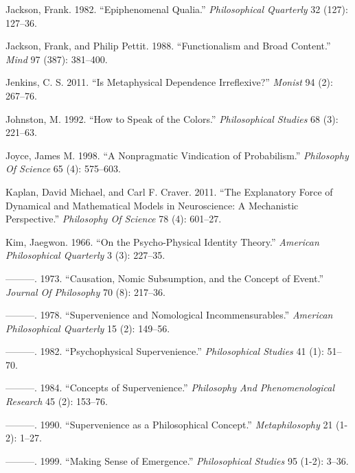 \documentclass[
  10pt,
  letterpaper,
  DIV=11,
  numbers=noendperiod,
  twoside]{scrartcl}
\newlength{\cslhangindent}
\newenvironment{CSLReferences}[2] %
 {\begin{list}{}{%
  \setlength{\itemindent}{0pt}
  \setlength{\leftmargin}{0pt}
  \setlength{\parsep}{0pt}
  \ifodd #1
   \setlength{\leftmargin}{\cslhangindent}
   \setlength{\itemindent}{-1\cslhangindent}
  \fi
  \setlength{\itemsep}{#2\baselineskip}}}
 {\end{list}}
\begin{document}
\begin{CSLReferences}{1}{0}
Jackson, Frank. 1982. {``Epiphenomenal Qualia.''} \emph{Philosophical
Quarterly} 32 (127): 127--36.

Jackson, Frank, and Philip Pettit. 1988. {``Functionalism and Broad
Content.''} \emph{Mind} 97 (387): 381--400.

Jenkins, C. S. 2011. {``Is Metaphysical Dependence Irreflexive?''}
\emph{Monist} 94 (2): 267--76.

Johnston, M. 1992. {``How to Speak of the Colors.''} \emph{Philosophical
Studies} 68 (3): 221--63.

Joyce, James M. 1998. {``A Nonpragmatic Vindication of Probabilism.''}
\emph{Philosophy Of Science} 65 (4): 575--603.

Kaplan, David Michael, and Carl F. Craver. 2011. {``The Explanatory
Force of Dynamical and Mathematical Models in Neuroscience: A
Mechanistic Perspective.''} \emph{Philosophy Of Science} 78 (4):
601--27.

Kim, Jaegwon. 1966. {``On the Psycho-Physical Identity Theory.''}
\emph{American Philosophical Quarterly} 3 (3): 227--35.

---------. 1973. {``Causation, Nomic Subsumption, and the Concept of
Event.''} \emph{Journal Of Philosophy} 70 (8): 217--36.

---------. 1978. {``Supervenience and Nomological Incommensurables.''}
\emph{American Philosophical Quarterly} 15 (2): 149--56.

---------. 1982. {``Psychophysical Supervenience.''} \emph{Philosophical
Studies} 41 (1): 51--70.

---------. 1984. {``Concepts of Supervenience.''} \emph{Philosophy And
Phenomenological Research} 45 (2): 153--76.

---------. 1990. {``Supervenience as a Philosophical Concept.''}
\emph{Metaphilosophy} 21 (1-2): 1--27.

---------. 1999. {``Making Sense of Emergence.''} \emph{Philosophical
Studies} 95 (1-2): 3--36.


\end{CSLReferences}
\end{document}
